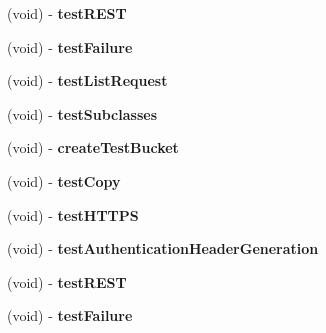 \begin{DoxyCompactItemize}
\item 
\hypertarget{interface_a_s_i_s3_request_tests_a8ca48a7b94614a7026f7b7862b722f89}{
(void) -\/ {\bfseries test\-R\-E\-S\-T}}
\label{interface_a_s_i_s3_request_tests_a8ca48a7b94614a7026f7b7862b722f89}

\item 
\hypertarget{interface_a_s_i_s3_request_tests_a91778029a97f36e77dad559977cdb550}{
(void) -\/ {\bfseries test\-Failure}}
\label{interface_a_s_i_s3_request_tests_a91778029a97f36e77dad559977cdb550}

\item 
\hypertarget{interface_a_s_i_s3_request_tests_adf56486c5a0e74cfdf0711c5fa016fb9}{
(void) -\/ {\bfseries test\-List\-Request}}
\label{interface_a_s_i_s3_request_tests_adf56486c5a0e74cfdf0711c5fa016fb9}

\item 
\hypertarget{interface_a_s_i_s3_request_tests_a7d8d7e21e0b483ca67889868688adb7d}{
(void) -\/ {\bfseries test\-Subclasses}}
\label{interface_a_s_i_s3_request_tests_a7d8d7e21e0b483ca67889868688adb7d}

\item 
\hypertarget{interface_a_s_i_s3_request_tests_a8cc7c1272f528811ee7d8f5e07fb1133}{
(void) -\/ {\bfseries create\-Test\-Bucket}}
\label{interface_a_s_i_s3_request_tests_a8cc7c1272f528811ee7d8f5e07fb1133}

\item 
\hypertarget{interface_a_s_i_s3_request_tests_a47ba82f8750aba0ef3928d442442e5c8}{
(void) -\/ {\bfseries test\-Copy}}
\label{interface_a_s_i_s3_request_tests_a47ba82f8750aba0ef3928d442442e5c8}

\item 
\hypertarget{interface_a_s_i_s3_request_tests_ab3c1fecc3be8fa9465a8e7a20de1f49e}{
(void) -\/ {\bfseries test\-H\-T\-T\-P\-S}}
\label{interface_a_s_i_s3_request_tests_ab3c1fecc3be8fa9465a8e7a20de1f49e}

\item 
\hypertarget{interface_a_s_i_s3_request_tests_a60bdada8e76611d7d565dff4b2cfd8a9}{
(void) -\/ {\bfseries test\-Authentication\-Header\-Generation}}
\label{interface_a_s_i_s3_request_tests_a60bdada8e76611d7d565dff4b2cfd8a9}

\item 
\hypertarget{interface_a_s_i_s3_request_tests_a8ca48a7b94614a7026f7b7862b722f89}{
(void) -\/ {\bfseries test\-R\-E\-S\-T}}
\label{interface_a_s_i_s3_request_tests_a8ca48a7b94614a7026f7b7862b722f89}

\item 
\hypertarget{interface_a_s_i_s3_request_tests_a91778029a97f36e77dad559977cdb550}{
(void) -\/ {\bfseries test\-Failure}}
\label{interface_a_s_i_s3_request_tests_a91778029a97f36e77dad559977cdb550}


\end{DoxyCompactItemize}
